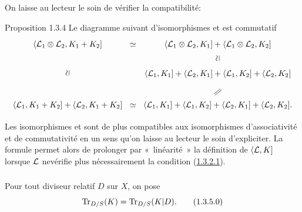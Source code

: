 \documentclass[10pt]{../fichiers-configuration-latex/smfart}
\begin{document}
On laisse au lecteur le soin de vérifier la compatibilité:

\begin{enonce*}{Proposition 1.3.4}
Le diagramme suivant d'isomorphismes  et  est
commutatif
$$
\xymatrix@C=.1cm@R=.1cm{
\langle \Ll_{1}\otimes \Ll_{2}, K_{1}+K_{2}] & \simeq & \langle
\Ll_{1}\otimes \Ll_{2}, K_{1}]+\langle \Ll_{1} \otimes \Ll_{2}, K_{2}]\\
 & & \rotatebox{90}{$\simeq$} \\
\rotatebox{90}{$\simeq$} & & \langle \Ll_{1}, K_{1}]+\langle\Ll_{2}, K_{1}]+\langle
    \Ll_{1}, K_{2}]+\langle \Ll_{2}, K_{2}]\\
 & & \rotatebox{-50}{$\Arrowvert$}\\
\langle\Ll_{1}, K_{1}+K_{2}]+\langle\Ll_{2},K_{1}+K_{2}] & \simeq  &
    \langle\Ll_{1}, K_{1}]+\langle \Ll_{1},K_{2}]+\langle\Ll_{2},K_{1}]+\langle\Ll_{2},K_{2}]. 
}
$$%



\end{enonce*}

Les isomorphismes  et  sont de plus
compatibles aux 
isomorphismes d'associativité et de commutativité en un sens qu'on
laisse au lecteur le soin d'expliciter. La formule  permet
alors de prolonger par « linéarité »  la définition de
$\langle {\mathcal L},K]$ lorsque ${\mathcal L}$ ne\pageoriginale vérifie plus
nécessairement la condition (\hyperref[XVIII.par1.3.2.1]{1.3.2.1}).

\setcounter{subsubsection}{4}
\subsubsection{}
Pour tout diviseur relatif $D$ sur $X$, on pose
\begin{equation*}
\operatorname{Tr}_{D/S}(K)=\operatorname{Tr}_{D/S}(K|D){}.\tag{1.3.5.0}
\end{equation*}
\end{document}
